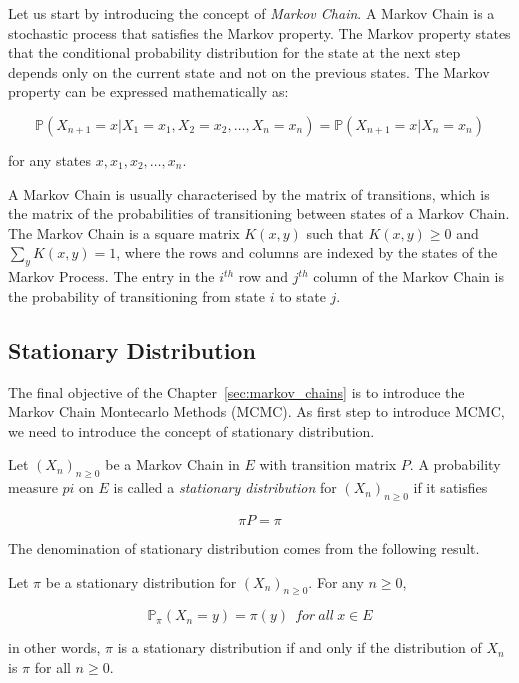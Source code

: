 \documentclass{report}
\begin{document}
Let us start by introducing the concept of \textit{Markov Chain}. A Markov Chain is a stochastic process that satisfies the Markov property. The Markov property states that the conditional probability distribution for the state at the next step depends only on the current state and not on the previous states. The Markov property can be expressed mathematically as:

\[
	\mathbb{P}(X_{n+1} = x | X_1 = x_1, X_2 = x_2, \dots, X_n = x_n) = \mathbb{P}(X_{n+1} = x | X_n = x_n)
\]

for any states \(x, x_1, x_2, \dots, x_n\). 

A Markov Chain is usually characterised by the matrix of transitions, which is the matrix of the probabilities of transitioning between states of a Markov Chain. The Markov Chain is a square matrix $K(x,y)$ such that $K(x,y) \geq 0$ and \(\sum_{y} K(x,y) = 1\), where the rows and columns are indexed by the states of the Markov Process. The entry in the \(i^{th}\) row and \(j^{th}\) column of the Markov Chain is the probability of transitioning from state \(i\) to state \(j\).

\subsection{Stationary Distribution}
\label{sec:stationary_distribution}

The final objective of the Chapter~\ref{sec:markov_chains} is to introduce the Markov Chain Montecarlo Methods (MCMC). As first step to introduce MCMC, we need to introduce the concept of stationary distribution. 

\begin{definition}
	Let $(X_n)_{n \geq 0}$ be a Markov Chain in $E$ with transition matrix $P$. A probability measure $pi$ on $E$ is called a \textit{stationary distribution} for $(X_n)_{n \geq 0}$ if it satisfies 
	
	\[
		\pi P = \pi
	\]
\end{definition}

The denomination of stationary distribution comes from the following result.

\begin{proposition}
	Let $\pi$ be a stationary distribution for $(X_n)_{n \geq 0}$. For any \(n \geq 0\),

	\[
		\mathbb{P}_\pi(X_n = y) = \pi(y) \ \ for \ all \ x \in E
	\]

	in other words, $\pi$ is a stationary distribution if and only if the distribution of $X_n$ is $\pi$ for all $n \geq 0$.
\end{proposition}
\end{document}
